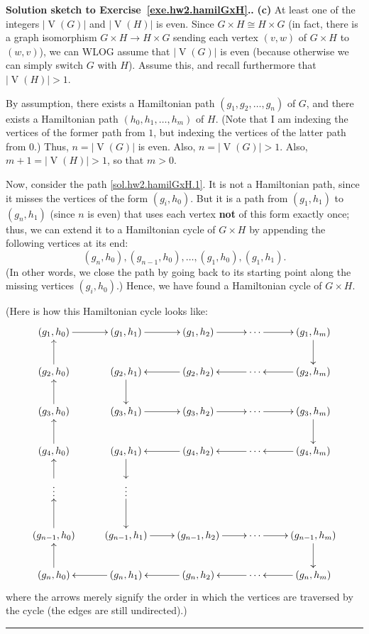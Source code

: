 \documentclass[numbers=enddot,12pt,final,onecolumn,notitlepage]{scrartcl}%
\theoremstyle{definition}
\newenvironment{proof}[1][Proof]{\noindent\textbf{#1.} }{\ \rule{0.5em}{0.5em}}
\newcommand{\abs}[1]{\left| #1 \right|}
\newcommand{\tup}[1]{\left( #1 \right)}
\newcommand{\verts}[1]{\operatorname{V}\left( #1 \right)}
\begin{document}
\begin{proof}[Solution sketch to Exercise~\ref{exe.hw2.hamilGxH}.]
\textbf{(c)} At least one of the integers $\abs{\verts{G}}$ and
$\abs{\verts{H}}$ is even.
Since
$G \times H \cong H \times G$ (in fact, there is a graph isomorphism
$G \times H \to H \times G$ sending each vertex $\tup{v, w}$ of
$G \times H$ to $\tup{w, v}$), we can WLOG assume that
$\abs{\verts{G}}$ is even (because otherwise we can simply switch
$G$ with $H$).
Assume this, and recall furthermore that $\abs{\verts{H}} > 1$.

By assumption, there exists a Hamiltonian path
$\tup{g_1, g_2, \ldots, g_n}$ of $G$, and there exists a Hamiltonian
path $\tup{h_0, h_1, \ldots, h_m}$ of $H$. (Note that I am indexing
the vertices of the former path from $1$, but indexing the vertices
of the latter path from $0$.) Thus, $n = \abs{\verts{G}}$ is even.
Also, $n = \abs{\verts{G}} > 1$.
Also, $m + 1 = \abs{\verts{H}} > 1$, so that $m > 0$.

Now, consider the path \eqref{sol.hw2.hamilGxH.1}. It is not a
Hamiltonian path, since it misses the vertices of the form
$\tup{g_i, h_0}$. But it is a path from $\tup{g_1, h_1}$ to
$\tup{g_n, h_1}$ (since $n$ is even) that uses each vertex
\textbf{not} of this form exactly once; thus, we can extend it to
a Hamiltonian cycle of $G \times H$ by appending the following
vertices at its end:
\[
 \tup{g_n, h_0}, \tup{g_{n-1}, h_0}, \ldots, \tup{g_1, h_0},
 \tup{g_1, h_1}.
\]
(In other words, we close the path by going back to its starting
point along the missing vertices $\tup{g_i, h_0}$.) Hence, we have
found a Hamiltonian cycle of $G \times H$.

(Here is how this Hamiltonian cycle looks like:
\[
\xymatrix{
\tup{g_1, h_0} \ar[r] & \tup{g_1, h_1} \ar[r] & \tup{g_1, h_2} \ar[r] & \cdots \ar[r] & \tup{g_1, h_m} \ar[d] \\
\tup{g_2, h_0} \ar[u] & \tup{g_2, h_1} \ar[d] & \tup{g_2, h_2} \ar[l] & \cdots \ar[l] & \tup{g_2, h_m} \ar[l] \\
\tup{g_3, h_0} \ar[u] & \tup{g_3, h_1} \ar[r] & \tup{g_3, h_2} \ar[r] & \cdots \ar[r] & \tup{g_3, h_m} \ar[d] \\
\tup{g_4, h_0} \ar[u] & \tup{g_4, h_1} \ar[d] & \tup{g_4, h_2} \ar[l] & \cdots \ar[l] & \tup{g_4, h_m} \ar[l] \\
\vdots \ar[u] & \vdots \ar[d] \\
\tup{g_{n-1}, h_0} \ar[u] & \tup{g_{n-1}, h_1} \ar[r] & \tup{g_{n-1}, h_2} \ar[r] & \cdots \ar[r] & \tup{g_{n-1}, h_m} \ar[d] \\
\tup{g_n, h_0} \ar[u] & \tup{g_n, h_1} \ar[l] & \tup{g_n, h_2} \ar[l] & \cdots \ar[l] & \tup{g_n, h_m} \ar[l]
}
\]
where the arrows merely signify the order in which the vertices are
traversed by the cycle (the edges are still undirected).)
\end{proof}
\end{document}
